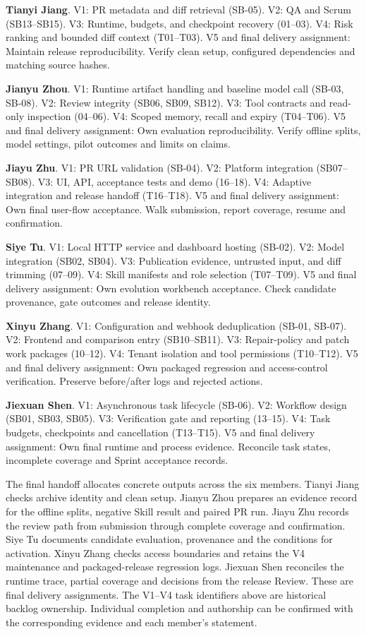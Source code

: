 \documentclass[journal,compsoc]{IEEEtran}
\begin{document}
\par \textbf{Tianyi Jiang}. V1: PR metadata and diff retrieval (SB-05). V2: QA and Scrum (SB13--SB15). V3: Runtime, budgets, and checkpoint recovery (01--03). V4: Risk ranking and bounded diff context (T01--T03). V5 and final delivery assignment: Maintain release reproducibility. Verify clean setup, configured dependencies and matching source hashes.
\par \textbf{Jianyu Zhou}. V1: Runtime artifact handling and baseline model call (SB-03, SB-08). V2: Review integrity (SB06, SB09, SB12). V3: Tool contracts and read-only inspection (04--06). V4: Scoped memory, recall and expiry (T04--T06). V5 and final delivery assignment: Own evaluation reproducibility. Verify offline splits, model settings, pilot outcomes and limits on claims.
\par \textbf{Jiayu Zhu}. V1: PR URL validation (SB-04). V2: Platform integration (SB07--SB08). V3: UI, API, acceptance tests and demo (16--18). V4: Adaptive integration and release handoff (T16--T18). V5 and final delivery assignment: Own final user-flow acceptance. Walk submission, report coverage, resume and confirmation.
\par \textbf{Siye Tu}. V1: Local HTTP service and dashboard hosting (SB-02). V2: Model integration (SB02, SB04). V3: Publication evidence, untrusted input, and diff trimming (07--09). V4: Skill manifests and role selection (T07--T09). V5 and final delivery assignment: Own evolution workbench acceptance. Check candidate provenance, gate outcomes and release identity.
\par \textbf{Xinyu Zhang}. V1: Configuration and webhook deduplication (SB-01, SB-07). V2: Frontend and comparison entry (SB10--SB11). V3: Repair-policy and patch work packages (10--12). V4: Tenant isolation and tool permissions (T10--T12). V5 and final delivery assignment: Own packaged regression and access-control verification. Preserve before/after logs and rejected actions.
\par \textbf{Jiexuan Shen}. V1: Asynchronous task lifecycle (SB-06). V2: Workflow design (SB01, SB03, SB05). V3: Verification gate and reporting (13--15). V4: Task budgets, checkpoints and cancellation (T13--T15). V5 and final delivery assignment: Own final runtime and process evidence. Reconcile task states, incomplete coverage and Sprint acceptance records.

The final handoff allocates concrete outputs across the six members. Tianyi Jiang checks archive identity and clean setup. Jianyu Zhou prepares an evidence record for the offline splits, negative Skill result and paired PR run. Jiayu Zhu records the review path from submission through complete coverage and confirmation. Siye Tu documents candidate evaluation, provenance and the conditions for activation. Xinyu Zhang checks access boundaries and retains the V4 maintenance and packaged-release regression logs. Jiexuan Shen reconciles the runtime trace, partial coverage and decisions from the release Review. These are final delivery assignments. The V1--V4 task identifiers above are historical backlog ownership. Individual completion and authorship can be confirmed with the corresponding evidence and each member's statement.
\end{document}
